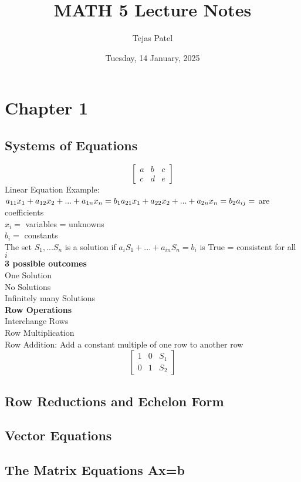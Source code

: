 \documentclass{article}
\title{MATH 5 Lecture Notes}
\date{Tuesday, 14 January, 2025}
\author{Tejas Patel}
\begin{document}
\maketitle
\tableofcontents
\pagebreak
\section{Chapter 1}
\subsection{Systems of Equations}
\[
\left[\begin{array}{cc|c}
a & b & c \\
c & d & e
\end{array}\right]
\]
Linear Equation Example:\\
$
a_{11}x_1 +a_{12}x_2 +...+ a_{1n}x_n =b_1\\
a_{21}x_1 +a_{22}x_2 +...+ a_{2n}x_n =b_2\\
a_{ij} = $ are coefficients\\ $
x_i = $ variables = unknowns\\ $
b_i =$ constants\\ 
The set $S_1, ... S_n$ is a solution if  $a_iS_1 +...+a_{in}S_n=b_i$ is True = consistent for all $i$
\\ \textbf{3 possible outcomes}\\
One Solution \\ No Solutions \\ Infinitely many Solutions
\\ \textbf{Row Operations}
\\Interchange Rows \\ Row Multiplication \\ Row Addition: Add a constant multiple of one row to another row
\[
\left[\begin{array}{cc|c}
1 & 0 & S_1 \\
0 & 1 & S_2
\end{array}\right]
\]
\subsection{Row Reductions and Echelon Form}
\subsection{Vector Equations}
\subsection{The Matrix Equations Ax=b}
\end{document}
